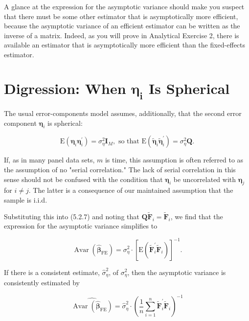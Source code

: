 \documentclass[10pt]{article}
\begin{document}
A glance at the expression for the asymptotic variance should make you suspect that there must be some other estimator that is asymptotically more efficient, because the asymptotic variance of an efficient estimator can be written as the inverse of a matrix. Indeed, as you will prove in Analytical Exercise 2, there is available an estimator that is asymptotically more efficient than the fixed-effects estimator.

\section*{Digression: When $\boldsymbol{\eta}_{\boldsymbol{i}}$ Is Spherical}
The usual error-components model assumes, additionally, that the second error component $\boldsymbol{\eta}_{i}$ is spherical:


\begin{equation*}
\mathrm{E}\left(\boldsymbol{\eta}_{i} \boldsymbol{\eta}_{i}^{\prime}\right)=\sigma_{\eta}^{2} \mathbf{I}_{M}, \text { so that } \mathrm{E}\left(\tilde{\boldsymbol{\eta}}_{i} \tilde{\boldsymbol{\eta}}_{i}^{\prime}\right)=\sigma_{\eta}^{2} \mathbf{Q} . \tag{5.2.12}
\end{equation*}


If, as in many panel data sets, $m$ is time, this assumption is often referred to as the assumption of no "serial correlation." The lack of serial correlation in this sense should not be confused with the condition that $\boldsymbol{\eta}_{i}$ be uncorrelated with $\boldsymbol{\eta}_{j}$ for $i \neq j$. The latter is a consequence of our maintained assumption that the sample is i.i.d.

Substituting this into (5.2.7) and noting that $\mathbf{Q} \widetilde{\mathbf{F}}_{i}=\widetilde{\mathbf{F}}_{i}$, we find that the expression for the asymptotic variance simplifies to


\begin{equation*}
\operatorname{Avar}\left(\widehat{\boldsymbol{\beta}}_{\mathrm{FE}}\right)=\sigma_{\eta}^{2} \cdot\left[\mathrm{E}\left(\widetilde{\mathbf{F}}_{i}^{\prime} \widetilde{\mathbf{F}}_{i}\right)\right]^{-1} . \tag{5.2.13}
\end{equation*}


If there is a consistent estimate, $\hat{\sigma}_{\eta}^{2}$, of $\sigma_{\eta}^{2}$, then the asymptotic variance is consistently estimated by


\begin{equation*}
\widehat{\operatorname{Avar}\left(\widehat{\boldsymbol{\beta}}_{\mathrm{FE}}\right)}=\hat{\sigma}_{\eta}^{2} \cdot\left(\frac{1}{n} \sum_{i=1}^{n} \widetilde{\mathbf{F}}_{i}^{\prime} \widetilde{\mathbf{F}}_{i}\right)^{-1} \tag{5.2.14}
\end{equation*}
\end{document}

